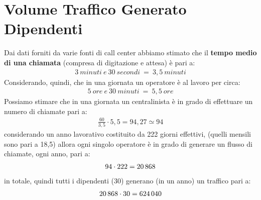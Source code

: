 \section[Volume Traffico Generato Dipendenti]{Volume Traffico Generato Dipendenti}
Dai dati forniti da varie fonti di call center abbiamo stimato che il \textbf{tempo medio di una chiamata} (compresa di digitazione e attesa) è pari a:
	\begin{equation}
	\label{eq:durata_media_chiamate}
	\begin{split}
		3 \: minuti \: e \: 30 \: secondi \: = \: 3,5 \: minuti  
	\end{split}
	\end{equation}
Considerando, quindi, che in una giornata un operatore è al lavoro per circa:
	\begin{equation}
	\label{eq:durata_orario_lavoro}
	\begin{split}
		5 \: ore \: e \: 30 \: minuti \: = \: 5,5 \: ore  
	\end{split}
	\end{equation}
Possiamo stimare che in una giornata un centralinista è in grado di effettuare un numero di chiamate pari a:
	\begin{equation}
	\label{eq:num_chiamate_singolo_operatore_giorno}
	\begin{split}
		\frac{60}{3,5} \cdot 5,5 = 94,27 \simeq 94 
	\end{split}
	\end{equation}
considerando un anno lavorativo costituito da 222 giorni effettivi, (quelli mensili sono pari a 18,5) allora ogni singolo operatore è in grado di generare un flusso di chiamate, ogni anno, pari a:
	\begin{equation}
	\label{eq:num_chiamate_singolo_operatore_anno}
	\begin{split}
		94 \cdot 222 = 20\thinspace 868 
	\end{split}
	\end{equation}
in totale, quindi tutti i dipendenti (30) generano (in un anno) un traffico pari a:
	\begin{equation}
	\label{eq:num_chiamate_azienda_anno}
	\begin{split}
		20\thinspace 868 \cdot 30 = 624\thinspace 040 
	\end{split}
	\end{equation}
